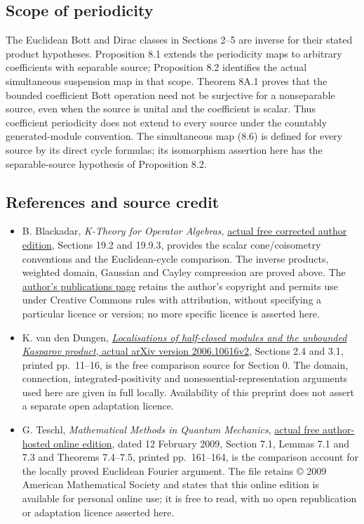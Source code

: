 \documentclass[
  11pt,
]{article}
\providecommand{\tightlist}{%
  \setlength{\itemsep}{0pt}\setlength{\parskip}{0pt}}
\begin{document}
\subsection{Scope of periodicity}\label{scope-of-periodicity}

The Euclidean Bott and Dirac classes in Sections 2--5 are inverse for
their stated product hypotheses. Proposition 8.1 extends the periodicity
maps to arbitrary coefficients with separable source; Proposition 8.2
identifies the actual simultaneous suspension map in that scope. Theorem
8A.1 proves that the bounded coefficient Bott operation need not be
surjective for a nonseparable source, even when the source is unital and
the coefficient is scalar. Thus coefficient periodicity does not extend
to every source under the countably generated-module convention. The
simultaneous map (8.6) is defined for every source by its direct cycle
formulas; its isomorphism assertion here has the separable-source
hypothesis of Proposition 8.2.

\subsection{References and source
credit}\label{references-and-source-credit}

\begin{itemize}
\tightlist
\item
  B. Blackadar, \emph{K-Theory for Operator Algebras},
  \href{https://www.bruceblackadar.com/Mathematics/book6.pdf}{actual
  free corrected author edition}, Sections 19.2 and 19.9.3, provides the
  scalar cone/coisometry conventions and the Euclidean-cycle comparison.
  The inverse products, weighted domain, Gaussian and Cayley compression
  are proved above. The
  \href{https://www.bruceblackadar.com/mathpubs.html}{author's
  publications page} retains the author's copyright and permits use
  under Creative Commons rules with attribution, without specifying a
  particular licence or version; no more specific licence is asserted
  here.
\item
  K. van den Dungen,
  \href{https://arxiv.org/pdf/2006.10616v2}{\emph{Localisations of
  half-closed modules and the unbounded Kasparov product}, actual arXiv
  version 2006.10616v2}, Sections 2.4 and 3.1, printed pp.~11--16, is
  the free comparison source for Section 0. The domain, connection,
  integrated-positivity and nonessential-representation arguments used
  here are given in full locally. Availability of this preprint does not
  assert a separate open adaptation licence.
\item
  G. Teschl, \emph{Mathematical Methods in Quantum Mechanics},
  \href{https://www.mat.univie.ac.at/~gerald/ftp/book-schroe/schroe.pdf}{actual
  free author-hosted online edition}, dated 12 February 2009, Section
  7.1, Lemmas 7.1 and 7.3 and Theorems 7.4--7.5, printed pp.~161--164,
  is the comparison account for the locally proved Euclidean Fourier
  argument. The file retains © 2009 American Mathematical Society and
  states that this online edition is available for personal online use;
  it is free to read, with no open republication or adaptation licence
  asserted here.
\end{itemize}
\end{document}
